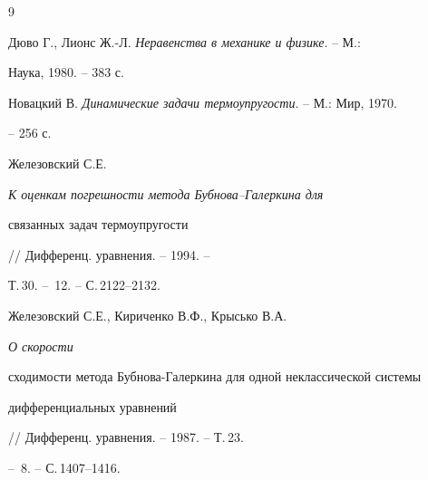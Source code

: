 \begin{thebibliography}{9}







Дюво Г., Лионс Ж.-Л. {\em Неравенства в механике и физике}. -- М.:


Наука, 1980. -- 383 с.




Новацкий В. {\em Динамические задачи термоупругости}. -- М.: Мир, 1970.


-- 256 с.




Железовский С.Е. {\em К оценкам погрешности метода Бубнова--Галеркина для


связанных задач термоупругости} // Дифференц. уравнения. -- 1994. --


Т.\,30. -- \No\,12. -- С.\,2122--2132.




Железовский С.Е., Кириченко В.Ф., Крысько В.А. {\em О скорости


сходимости метода Бубнова-Галеркина для одной неклассической системы


дифференциальных уравнений} // Дифференц. уравнения. -- 1987. -- Т.\,23.


-- \No\,8. -- С.\,1407--1416.





\end{thebibliography}





\vskip 2cm














\label{end}






